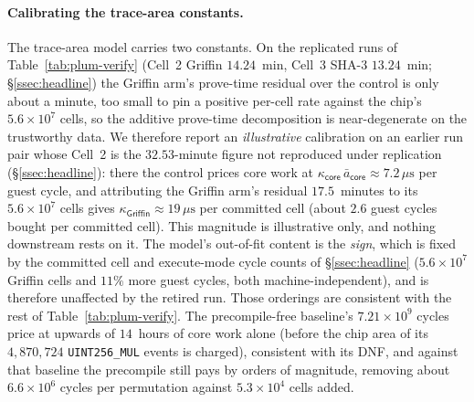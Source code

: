\paragraph{Calibrating the trace-area constants.}
The trace-area model carries two constants. On the replicated runs of Table~\ref{tab:plum-verify} (Cell~2 Griffin $14.24$~min, Cell~3 SHA-3 $13.24$~min; \S\ref{ssec:headline}) the Griffin arm's prove-time residual over the control is only about a minute, too small to pin a positive per-cell rate against the chip's $5.6\times10^{7}$ cells, so the additive prove-time decomposition is near-degenerate on the trustworthy data. We therefore report an \emph{illustrative} calibration on an earlier run pair whose Cell~2 is the $32.53$-minute figure not reproduced under replication (\S\ref{ssec:headline}): there the control prices core work at $\kappa_{\mathsf{core}}\,\bar a_{\mathsf{core}}\approx 7.2\,\mu\mathrm{s}$ per guest cycle, and attributing the Griffin arm's residual $17.5$~minutes to its $5.6\times10^{7}$ cells gives $\kappa_{\mathsf{Griffin}}\approx 19\,\mu\mathrm{s}$ per committed cell (about $2.6$ guest cycles bought per committed cell). This magnitude is illustrative only, and nothing downstream rests on it. The model's out-of-fit content is the \emph{sign}, which is fixed by the committed cell and execute-mode cycle counts of \S\ref{ssec:headline} ($5.6\times10^{7}$ Griffin cells and $11\%$ more guest cycles, both machine-independent), and is therefore unaffected by the retired run. Those orderings are consistent with the rest of Table~\ref{tab:plum-verify}. The precompile-free baseline's $7.21\times10^{9}$ cycles price at upwards of $14$~hours of core work alone (before the chip area of its $4{,}870{,}724$ \texttt{UINT256\_MUL} events is charged), consistent with its DNF, and against that baseline the precompile still pays by orders of magnitude, removing about $6.6\times10^{6}$ cycles per permutation against $5.3\times10^{4}$ cells added.

